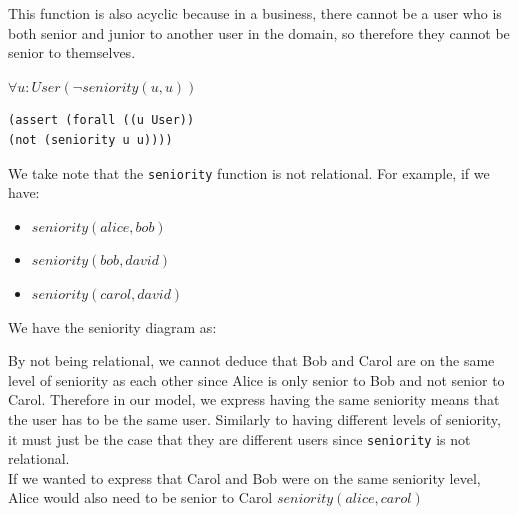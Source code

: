 \documentclass[a4paper]{report}
\begin{document}
This function is also acyclic because in a business, there cannot be a user who is both senior and junior to another user in the domain, so therefore they cannot be senior to themselves.
\begin{center}
$\forall u : User (\neg seniority(u, u))$
\end{center}
\begin{lstlisting}[frame=single]
(assert (forall ((u User))
(not (seniority u u))))
\end{lstlisting}

We take note that the \texttt{seniority} function is not relational. For example, if we have:
\begin{itemize}
\item $seniority(alice, bob)$
\item $seniority(bob, david)$
\item $seniority(carol, david)$
\end{itemize}
We have the seniority diagram as:
\begin{figure}[!h]
\center
{}
\end{figure}

By not being relational, we cannot deduce that Bob and Carol are on the same level of seniority as each other since Alice is only senior to Bob and not senior to Carol. Therefore in our model, we express having the same seniority means that the user has to be the same user. Similarly to having different levels of seniority, it must just be the case that they are different users since \texttt{seniority} is not relational.\\

If we wanted to express that Carol and Bob were on the same seniority level, Alice would also need to be senior to Carol $seniority(alice, carol)$
\begin{center}
\end{center}
\end{document}
